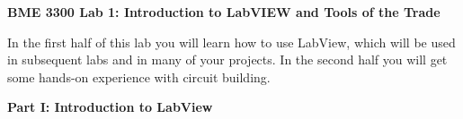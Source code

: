 \documentclass[12pt]{article}
\begin{document}
\thispagestyle{plain} %





\begin{center}
\bigskip

\textbf{BME 3300 Lab 1: Introduction to LabVIEW and Tools of the Trade} \medskip

\end{center}

\noindent In the first half of this lab you will learn how to use LabView, which will be used in subsequent labs and in many of your projects. 
In the second half you will get some hands-on experience with circuit building.

\bigskip

\noindent\textbf{Part I: Introduction to LabView}
\end{document}
